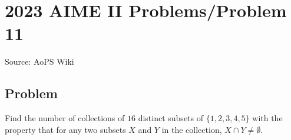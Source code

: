 \documentclass[12pt]{article}
\begin{document}
\section*{{2023 AIME II Problems/Problem 11}}
Source: AoPS Wiki

\subsection*{Problem}
Find the number of collections of $16$ distinct subsets of $\{1,2,3,4,5\}$ with the property that for any two subsets $X$ and $Y$ in the collection, $X \cap Y \not= \emptyset.$
\end{document}
